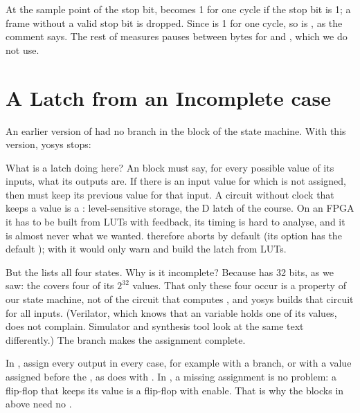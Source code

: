 
At the sample point of the stop bit,  becomes 1 for one cycle if
the stop bit is 1; a frame without a valid stop bit is dropped. Since
 is 1 for one cycle, so is , as the comment says.
The rest of  measures pauses between bytes for
 and , which we do not use.

\section{A Latch from an Incomplete case}
\label{sec:step06-latch}

An earlier version of  had no  branch in the
 block of the state machine. With this version, yosys stops:


What is a latch doing here? An  block must say, for every
possible value of its inputs, what its outputs are. If there is an input value
for which  is not assigned, then  must keep its
previous value for that input. A circuit without clock that keeps a value is a
: level-sensitive storage, the D latch of the course. On an FPGA
it has to be built from LUTs with feedback, its timing is hard to analyse, and
it is almost never what we wanted.  therefore aborts by
default (its option  has the default ); with
 it would only warn and build the latch from LUTs.

But the  lists all four states. Why is it incomplete? Because
 has 32 bits, as we saw: the  covers four of its $2^{32}$
values. That only these four occur is a property of our state machine, not of
the circuit that computes , and yosys builds that circuit for
all inputs. (Verilator, which knows that an  variable holds one of its
values, does not complain. Simulator and synthesis tool look at the same text
differently.) The  branch makes the assignment complete.

\begin{pitfall}
In , assign every output in every case, for example with a
 branch, or with a value assigned before the , as
 does with . In , a missing
assignment is no problem: a flip-flop that keeps its value is a flip-flop with
enable. That is why the  blocks in  above need no
.
\end{pitfall}

